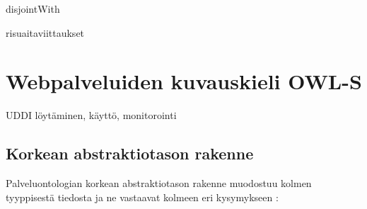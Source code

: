 \documentclass[finnish]{tktltiki2}
\theoremstyle{definition}
\theoremstyle{remark}
\begin{document}
disjointWith

risuaitaviittaukset


\section{Webpalveluiden kuvauskieli OWL-S}

UDDI löytäminen, käyttö, monitorointi

\subsection{Korkean abstraktiotason rakenne}

Palveluontologian korkean abstraktiotason rakenne muodostuu kolmen tyyppisestä tiedosta ja ne vastaavat kolmeen eri kysymykseen \cite{OWLS}:
\end{document}
